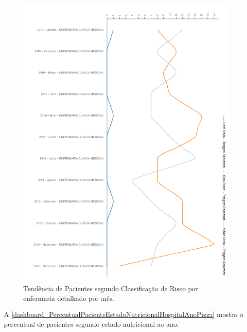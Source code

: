 \begin{figure}[htb]
	\caption{\label{dashboard_PercentualPacientesClassificacaoRiscoEnfermariaMesLinha}Tendência de Pacientes segundo Classificação de Risco por enfermaria detalhado por mês.}
	\begin{center}
	    \includegraphics[scale=0.9]{Imagens/2.4.PercentualPacientesClassificacaoRiscoEnfermariaMesLinha.png}
	\end{center}
\end{figure}

\newpage
A \autoref{dashboard_PercentualPacienteEstadoNutricionalHospitalAnoPizza} mostra o percentual de pacientes segundo estado nutricional ao ano.

